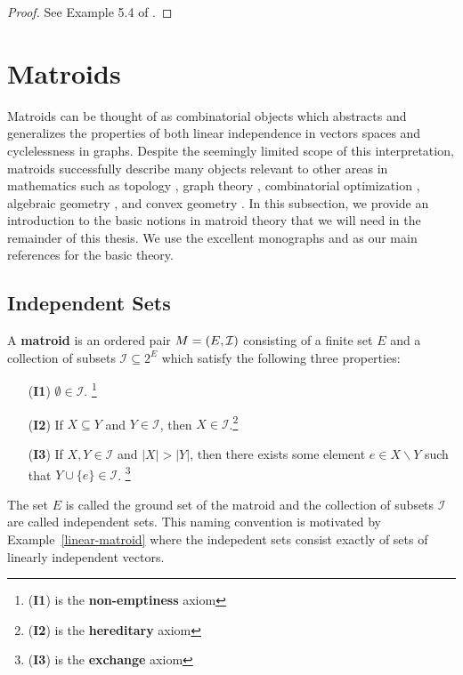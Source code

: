 \documentclass{puthesis-UG}
\begin{document}
\begin{proof}
	See Example 5.4 of \cite{bapat_raghavan_1997}. 
\end{proof}


\section{Matroids}

Matroids can be thought of as combinatorial objects which abstracts and generalizes the properties of both linear independence in vectors spaces and cyclelessness in graphs. Despite the seemingly limited scope of this interpretation, matroids successfully describe many objects relevant to other areas in mathematics such as topology \cite{gelfand}, graph theory \cite{milnor-numbers}, combinatorial optimization \cite{optimization}, algebraic geometry \cite{schubert-cell}, and convex geometry \cite{matroid-polytope}. In this subsection, we provide an introduction to the basic notions in matroid theory that we will need in the remainder of this thesis. We use the excellent monographs \cite{10.5555/1197093} and \cite{welsh} as our main references for the basic theory.

\subsection{Independent Sets}
\begin{defn}
	A \textbf{matroid} is an ordered pair $M = (E, \mathcal{I})$ consisting of a finite set $E$ and a collection of subsets $\mathcal{I} \subseteq 2^E$ which satisfy the following three properties:
	\begin{enumerate}
		\item[(\textbf{I1})] $\emptyset \in \mathcal{I}$. \footnote{(\textbf{I1}) is the \textbf{non-emptiness} axiom}
		\item[(\textbf{I2})] If $X \subseteq Y$ and $Y \in \mathcal{I}$, then $X \in \mathcal{I}$.\footnote{(\textbf{I2}) is the \textbf{hereditary} axiom}
		\item[(\textbf{I3})] If $X, Y \in \mathcal{I}$ and $|X| > |Y|$, then there exists some element $e \in X \backslash Y$ such that $Y \cup \{e\} \in \mathcal{I}$. \footnote{(\textbf{I3}) is the \textbf{exchange} axiom}
	\end{enumerate}
	The set $E$ is called the ground set of the matroid and the collection of subsets $\mathcal{I}$ are called independent sets. This naming convention is motivated by Example~\ref{linear-matroid} where the indepedent sets consist exactly of sets of linearly independent vectors. 
\end{defn}
\end{document}
